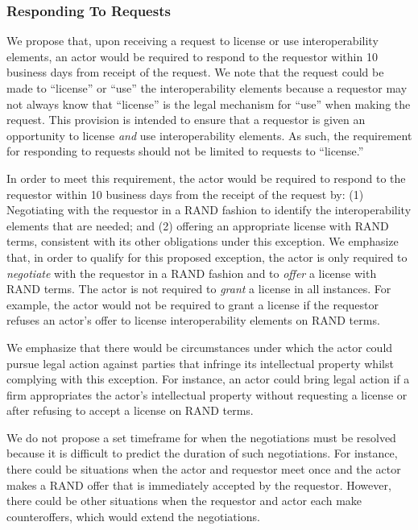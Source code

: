 \documentclass[twoside,11pt]{article}
\begin{document}
          \subsubsection{Responding To Requests}


          We propose that, upon receiving a request to license or use interoperability elements, an actor would be required to respond to the requestor within 10 business days from receipt of the request. We note that the request could be made to “license” or “use” the interoperability elements because a requestor may not always know that “license” is the legal mechanism for “use” when making the request. This provision is intended to ensure that a requestor is given an opportunity to license \emph{and} use interoperability elements. As such, the requirement for responding to requests should not be limited to requests to “license.”



          In order to meet this requirement, the actor would be required to respond to the requestor within 10 business days from the receipt of the request by: (1) Negotiating with the requestor in a RAND fashion to identify the interoperability elements that are needed; and (2) offering an appropriate license with RAND terms, consistent with its other obligations under this exception. We emphasize that, in order to qualify for this proposed exception, the actor is only required to \emph{negotiate} with the requestor in a RAND fashion and to \emph{offer} a license with RAND terms. The actor is not required to \emph{grant} a license in all instances. For example, the actor would not be required to grant a license if the requestor refuses an actor's offer to license interoperability elements on RAND terms.


          We emphasize that there would be circumstances under which the actor could pursue legal action against parties that infringe its intellectual property whilst complying with this exception. For instance, an actor could bring legal action if a firm appropriates the actor's intellectual property without requesting a license or after refusing to accept a license on RAND terms.


          We do not propose a set timeframe for when the negotiations must be resolved because it is difficult to predict the duration of such negotiations. For instance, there could be situations when the actor and requestor meet once and the actor makes a RAND offer that is immediately accepted by the requestor. However, there could be other situations when the requestor and actor each make counteroffers, which would extend the negotiations.
\end{document}
